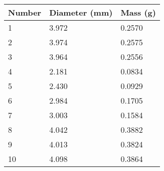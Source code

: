 \documentclass[a4paper, 12pt]{article}
\begin{document}
    \vspace{1.5em}

    \begin{tabular}{l l l}
        \bfseries Number & \bfseries Diameter (mm) & \bfseries Mass (g) \\ \hline
        1                & 3.972                   & 0.2570             \\ \hline
        2                & 3.974                   & 0.2575             \\ \hline
        3                & 3.964                   & 0.2556             \\ \hline
        4                & 2.181                   & 0.0834             \\ \hline
        5                & 2.430                   & 0.0929             \\ \hline
        6                & 2.984                   & 0.1705             \\ \hline
        7                & 3.003                   & 0.1584             \\ \hline
        8                & 4.042                   & 0.3882             \\ \hline
        9                & 4.013                   & 0.3824             \\ \hline
        10               & 4.098                   & 0.3864             \\ \hline
    \end{tabular}


%
%
\end{document}
